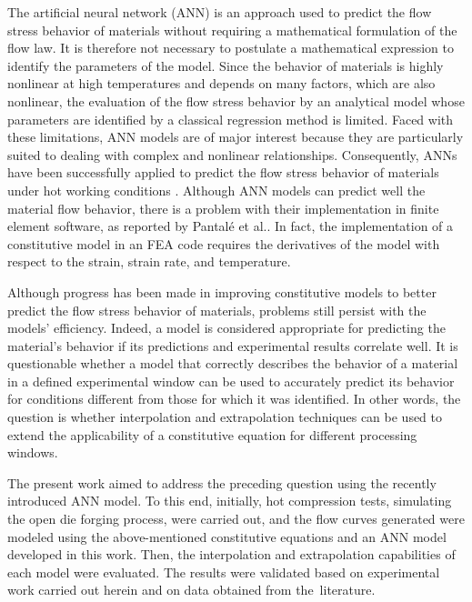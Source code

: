 \documentclass[metals,article,accept,pdftex,moreauthors]{Definitions/mdpi}
\makeatletter
\DeclareRobustCommand{\eal}{et al.\@\xspace}
\makeatother
\begin{document}
The artificial neural network (ANN) is an approach used to predict the flow stress behavior of materials without requiring a mathematical formulation of the flow law.
It is therefore not necessary to postulate a mathematical expression to identify the parameters of the model.
Since the behavior of materials is highly nonlinear at high temperatures and depends on many factors, which are also nonlinear, the evaluation of the flow stress behavior by an analytical model whose parameters are identified by a classical regression method is limited.
Faced with these limitations, ANN models are of major interest because they are particularly suited to dealing with complex and nonlinear relationships.
Consequently, ANNs have been successfully applied to predict the flow stress behavior of materials under hot working conditions \cite{wu2022experimental, stoffel2020deep, Ashtiani-2016-CSP, Stoffel-2019-NNB}.
Although ANN models can predict well the material flow behavior, there is a problem with their implementation in finite element software, as reported by Pantalé \eal \cite{Pantale-2021, Pantale-2023}.
In fact, the implementation of a constitutive model in an FEA code requires the derivatives of the model with respect to the strain, strain rate, and temperature.

Although progress has been made in improving constitutive models to better predict the flow stress behavior of materials, problems still persist with the models' efficiency.
Indeed, a model is considered appropriate for predicting the material's behavior if its predictions and experimental results correlate well.
It is questionable whether a model that correctly describes the behavior of a material in a defined experimental window can be used to accurately predict its behavior for conditions different from those for which it was identified.
In other words, the question is whether interpolation and extrapolation techniques can be used to extend the applicability of a constitutive equation for different processing windows.

The present work aimed to address the preceding question using the recently introduced ANN model.
To this end, initially, hot compression tests, simulating the open die forging process, were carried out, and the flow curves generated were modeled using the above-mentioned constitutive equations and an ANN model developed in this work.
Then, the interpolation and extrapolation capabilities of each model were evaluated.
The results were validated based on experimental work carried out herein and on data obtained from the~literature.
\end{document}
